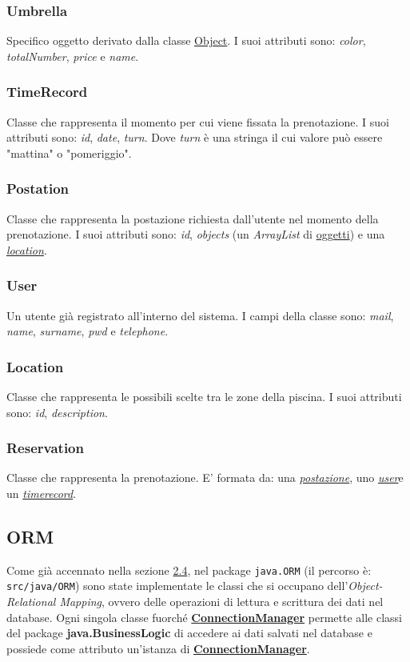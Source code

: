 \documentclass{article}
\begin{document}
\subsubsection{Umbrella}\label{subsubsec:umbrella}
Specifico oggetto derivato dalla classe \hyperref[subsubsec:object]{Object}. I suoi attributi sono: \textit{color},  \textit{totalNumber}, \textit{price} e \textit{name}.
\subsubsection{TimeRecord}\label{subsubsec:timerecord}
Classe che rappresenta il momento per cui viene fissata la prenotazione. I suoi attributi sono: \textit{id}, \textit{date}, \textit{turn}. Dove \textit{turn} è una stringa il cui valore può essere "mattina" o "pomeriggio".
\subsubsection{Postation}\label{subsubsec:postation}
Classe che rappresenta la postazione richiesta dall'utente nel momento della prenotazione. I suoi attributi sono: \textit{id}, \textit{objects} (un \textit{ArrayList} di \hyperref[subsubsec:object]{oggetti}) e una \hyperref[subsubsec:Location]{\textit{location}}.
\subsubsection{User}\label{subsubsec:user}
Un utente già registrato all'interno del sistema. I campi della classe sono: \textit{mail}, \textit{name}, \textit{surname}, \textit{pwd} e \textit{telephone}.
\subsubsection{Location}\label{subsubsec:Location}
Classe che rappresenta le possibili scelte tra le zone della piscina. I suoi attributi sono: \textit{id}, \textit{description}.
\subsubsection{Reservation}\label{subsubsec:reservation}
Classe che rappresenta la prenotazione. E' formata da: una \hyperref[subsubsec:postation]{\textit{postazione}}, uno \hyperref[subsubsec:user]{\textit{user}}e un \hyperref[subsubsec:timerecord]{\textit{timerecord}}.
\subsection{ORM}\label{subsec:ORM}
Come già accennato nella sezione \hyperref[subsec:class-diagram]{2.4}, nel package \texttt{java.ORM} (il percorso è: \\ \texttt{src/java/ORM})
            sono state implementate le classi che si occupano dell'\textit{Object-Relational Mapping}, ovvero delle  operazioni di lettura e scrittura dei dati nel database.
            Ogni singola classe fuorché \hyperref[subsubsec:connectionmanager]{\textbf{ConnectionManager}} permette alle classi del package \textbf{java.BusinessLogic} di accedere ai dati salvati nel database e possiede come attributo un'istanza di \hyperref[subsubsec:connectionmanager]{\textbf{ConnectionManager}}.
            
\end{document}
